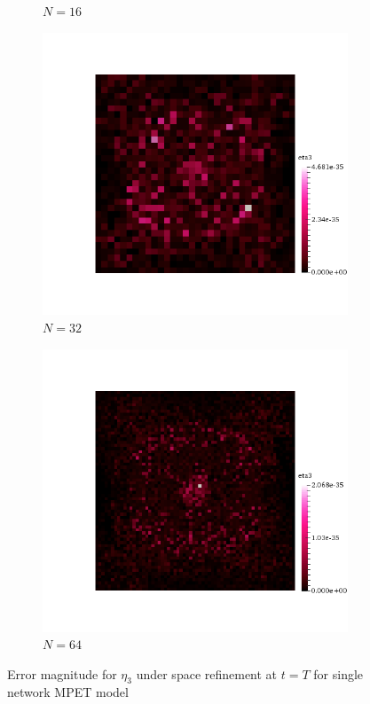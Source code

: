 \begin{figure}[h!]
\begin{subfigure}[b]{0.24\textwidth}
    \caption{$N=16$}
  \end{subfigure}
  \begin{subfigure}[b]{0.24\textwidth}
    \includegraphics[width=\textwidth,height=\textheight,keepaspectratio,height=\textheight,keepaspectratio]{figures/1_mpet/space/eta3_32.png}
    \caption{$N=32$}
  \end{subfigure}
  \begin{subfigure}[b]{0.24\textwidth}
    \includegraphics[width=\textwidth,height=\textheight,keepaspectratio,height=\textheight,keepaspectratio]{figures/1_mpet/space/eta3_64.png}
    \caption{$N=64$}
  \end{subfigure}
  \caption{Error magnitude for $\eta_3$ under space refinement at $t=T$ for single network MPET model} \label{fig:biot_eta3}
\end{figure}

